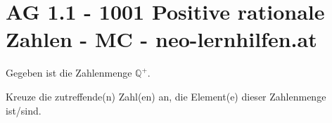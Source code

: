 \section{AG 1.1 - 1001 Positive rationale Zahlen - MC - neo-lernhilfen.at}

\begin{beispiel}[AG 1.1]{1} %
				Gegeben ist die Zahlenmenge $\mathbb{Q}^{+}$.
				
				Kreuze die zutreffende(n) Zahl(en) an, die Element(e) dieser Zahlenmenge ist/sind.
\end{beispiel}